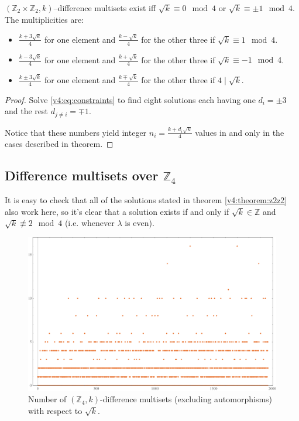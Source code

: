     \begin{theorem}
        \label{v4:theorem:z2z2}
        $(\mathbb Z_2 \times \mathbb Z_2, k)$--difference multisets exist iff $\sqrt k \equiv 0 \mod 4$ or $\sqrt k \equiv \pm 1 \mod 4$. The multiplicities are:
        \begin{itemize}
            \item $\frac{k + 3 \sqrt k}{4}$ for one element and $\frac{k - \sqrt k}{4}$ for the other three if $\sqrt k \equiv 1 \mod 4$.
            \item $\frac{k - 3 \sqrt k}{4}$ for one element and $\frac{k + \sqrt k}{4}$ for the other three if $\sqrt k \equiv -1 \mod 4$.
            \item $\frac{k \pm 3 \sqrt k}{4}$ for one element and $\frac{k \mp \sqrt k}{4}$ for the other three if $4 \mid \sqrt k$.
        \end{itemize}
    \end{theorem}
    
    \begin{proof}
        Solve \eqref{v4:eq:constraints} to find eight solutions each having one $d_i = \pm 3$ and the rest $d_{j \neq i} = \mp 1$.
        
        Notice that these numbers yield integer $n_i = \frac{k+d_i \sqrt k}4$ values in and only in the cases described in theorem.
    \end{proof}

\subsection{Difference multisets over $\mathbb Z_4$}
    It is easy to check that all of the solutions stated in theorem \ref{v4:theorem:z2z2} also work here, so it's clear that a solution exists if and only if $\sqrt k \in \mathbb Z$ and $\sqrt k \not\equiv 2 \mod 4$ (i.e. whenever $\lambda$ is even).
    
    \begin{figure}
        \includegraphics[width=\textwidth]{assets/z4}
        \caption{Number of $(\mathbb Z_4, k)$-difference multisets (excluding automorphisms) with respect to $\sqrt k$.}
        \label{other:z4:figure:results}
    \end{figure}
    
